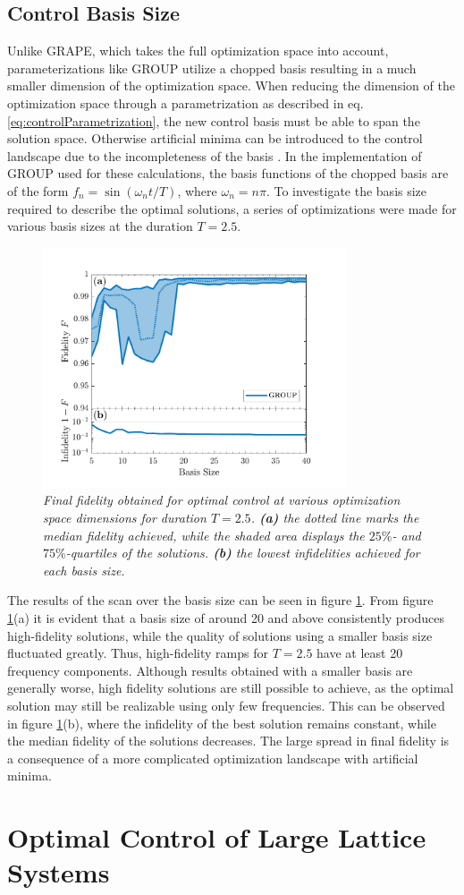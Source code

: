 \subsection{Control Basis Size}
Unlike GRAPE, which takes the full optimization space into account, parameterizations like GROUP utilize a chopped basis resulting in a much smaller dimension of the optimization space. When reducing the dimension of the optimization space through a parametrization as described in eq. \eqref{eq:controlParametrization}, the new control basis must be able to span the solution space. Otherwise artificial minima can be introduced to the control landscape due to the incompleteness of the basis \cite{Rach2015}. 
In the implementation of GROUP used for these calculations, the basis functions of the chopped basis are of the form $f_n = \sin \left( \omega_n t / T \right)$, where $\omega_n = n \pi$.
To investigate the basis size required to describe the optimal solutions, a series of optimizations were made for various basis sizes at the duration $T = 2.5$. 
\begin{figure}[h!]
    \centering
    \includegraphics[width=0.8\textwidth]{Figures/5part/BestFidelityBasisSize.pdf}
    \caption{\textit{Final fidelity obtained for optimal control at various optimization space dimensions for duration $T = 2.5$. \textbf{(a)} the dotted line marks the median fidelity achieved, while the shaded area displays the $25\%$- and $75\%$-quartiles of the solutions. \textbf{(b)} the lowest infidelities achieved for each basis size.}}
    \label{fig:FidelityBasisSize5}
\end{figure}
The results of the scan over the basis size can be seen in figure \ref{fig:FidelityBasisSize5}. From figure \ref{fig:FidelityBasisSize5}(a) it is evident that a basis size of around 20 and above consistently produces high-fidelity solutions, while the quality of solutions using a smaller basis size fluctuated greatly. Thus, high-fidelity ramps for $T = 2.5$ have at least 20 frequency components. Although results obtained with a smaller basis are generally worse, high fidelity solutions are still possible to achieve, as the optimal solution may still be realizable using only few frequencies. This can be observed in figure \ref{fig:FidelityBasisSize5}(b), where the infidelity of the best solution remains constant, while the median fidelity of the solutions decreases. The large spread in final fidelity is a consequence of a more complicated optimization landscape with artificial minima.


\section{Optimal Control of Large Lattice Systems} \label{sec:20partOptimization}